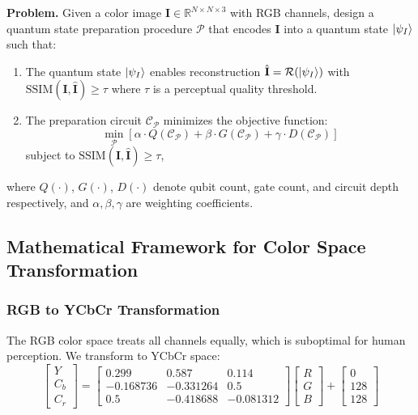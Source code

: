 \documentclass{ipol}
\begin{document}
\textbf{Problem.} Given a color image $\mathbf{I} \in \mathbb{R}^{N \times N \times 3}$
with RGB channels, design a quantum state preparation procedure $\mathcal{P}$
that encodes $\mathbf{I}$ into a quantum state $\ket{\psi_I}$ such that:
\begin{enumerate}
  \item The quantum state $\ket{\psi_I}$ enables reconstruction
    $\hat{\mathbf{I}} = \mathcal{R}(\ket{\psi_I})$ with
    $\text{SSIM}(\mathbf{I}, \hat{\mathbf{I}}) \geq \tau$ where $\tau$ is a
    perceptual quality threshold.
  \item The preparation circuit $\mathcal{C}_{\mathcal{P}}$ minimizes the
    objective function:
    \begin{equation}
      \min_{\mathcal{P}} \left[ \alpha \cdot Q(\mathcal{C}_{\mathcal{P}}) +
        \beta \cdot G(\mathcal{C}_{\mathcal{P}}) +
        \gamma \cdot D(\mathcal{C}_{\mathcal{P}}) \right]
      \label{eq:optimization}
    \end{equation}
    subject to $\text{SSIM}(\mathbf{I}, \hat{\mathbf{I}}) \geq \tau$,
\end{enumerate}
where $Q(\cdot)$, $G(\cdot)$, $D(\cdot)$ denote qubit count, gate count, and
circuit depth respectively, and $\alpha, \beta, \gamma$ are weighting
coefficients.

\FloatBarrier
\subsection{Mathematical Framework for Color Space Transformation}

\FloatBarrier
\subsubsection{RGB to YCbCr Transformation}

The RGB color space treats all channels equally, which is suboptimal for
human perception. We transform to YCbCr space:
\begin{equation}
\begin{bmatrix} Y \\ C_b \\ C_r \end{bmatrix} =
\begin{bmatrix}
  0.299 & 0.587 & 0.114 \\
  -0.168736 & -0.331264 & 0.5 \\
  0.5 & -0.418688 & -0.081312
\end{bmatrix}
\begin{bmatrix} R \\ G \\ B \end{bmatrix} +
\begin{bmatrix} 0 \\ 128 \\ 128 \end{bmatrix}
\label{eq:rgb_to_ycbcr}
\end{equation}
\end{document}
